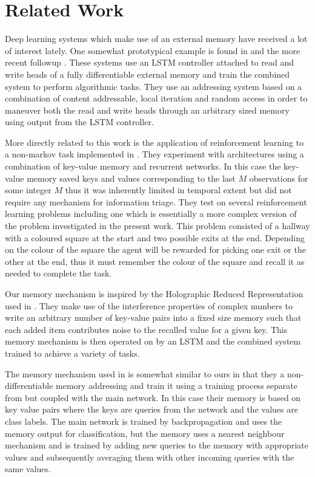 \documentclass{article}
\begin{document}
\section*{Related Work}
Deep learning systems which make use of an external memory have received a lot of interest lately. One somewhat prototypical example is found in \cite{NTM} and the more recent followup \cite{DNC} . These systems use an LSTM controller attached to read and write heads of a fully differentiable external memory and train the combined system to perform algorithmic tasks. They use an addressing system based on a combination of content addressable, local iteration and random access in order to maneuver both the read and write heads through an arbitrary sized memory using output from the LSTM controller.

More directly related to this work is the application of reinforcement learning to a non-markov task implemented in \cite{MC}. They experiment with architectures using a combination of key-value memory and recurrent networks. In this case the key-value memory saved keys and values corresponding to the last $M$ observations for some integer $M$ thus it was inherently limited in temporal extent but did not require any mechanism for information triage. They test on several reinforcement learning problems including one which is essentially a more complex version of the problem investigated in the present work. This problem consisted of a hallway with a coloured square at the start and two possible exits at the end. Depending on the colour of the square the agent will be rewarded for picking one exit or the other at the end, thus it must remember the colour of the square and recall it as needed to complete the task.

Our memory mechanism is inspired by the Holographic Reduced Representation used in \cite{LSTM}. They make use of the interference properties of complex numbers to write an arbitrary number of key-value pairs into a fixed size memory such that each added item contributes noise to the recalled value for a given key. This memory mechanism is then operated on by an LSTM and the combined system trained to achieve a variety of tasks.

The memory mechanism used in \cite{RARE} is somewhat similar to ours in that they a non-differentiable memory addressing and train it using a training process separate from but coupled with the main network. In this case their memory is based on key value pairs where the keys are queries from the network and the values are class labels. The main network is trained by backpropagation and uses the memory output for classification, but the memory uses a nearest neighbour mechanism and is trained by adding new queries to the memory with appropriate values and subsequently averaging them with other incoming queries with the same values.
\end{document}
